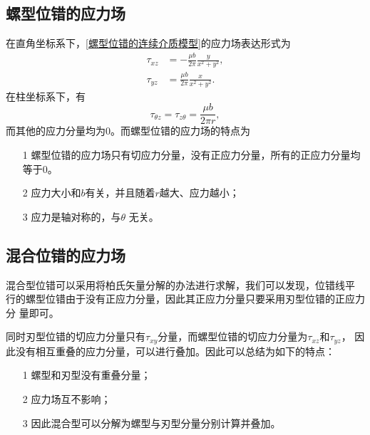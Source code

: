             \subsection{螺型位错的应力场}
                在直角坐标系下，\autoref{螺型位错的连续介质模型}的应力场表达形式为
                \begin{align} 
                    \tau_{x z} &=-\frac{\mu b}{2 \pi} \frac{y}{x^{2}+y^{2}}, \\
                    \tau_{y z} &=\frac{\mu b}{2 \pi} \frac{x}{x^{2}+y^{2}}. 
                \end{align}
                在柱坐标系下，有
                \begin{equation}
                    \tau_{\theta z}=\tau_{z\theta}=\frac{\mu b}{2\pi r},
                \end{equation}
                而其他的应力分量均为0。而螺型位错的应力场的特点为
                \begin{itemize}
                    \item[1]  螺型位错的应力场只有切应力分量，没有正应力分量，所有的正应力分量均等于0。
                    \item[2] 应力大小和$b$有关，并且随着$r$越大、应力越小；
                    \item[3] 应力是轴对称的，与$θ$ 无关。
                \end{itemize}
            \subsection{混合位错的应力场}
                混合型位错可以采用将柏氏矢量分解的办法进行求解，我们可以发现，位错线平
                行的螺型位错由于没有正应力分量，因此其正应力分量只要采用刃型位错的正应力分
                量即可。
                
                同时刃型位错的切应力分量只有$\tau_{xy}$分量，而螺型位错的切应力分量为$\tau_{xz}$和$\tau_{yz}$，
                因此没有相互重叠的应力分量，可以进行叠加。因此可以总结为如下的特点：
                \begin{itemize}
                    \item[1] 螺型和刃型没有重叠分量；
                    \item[2] 应力场互不影响；
                    \item[3] 因此混合型可以分解为螺型与刃型分量分别计算并叠加。
                \end{itemize}
